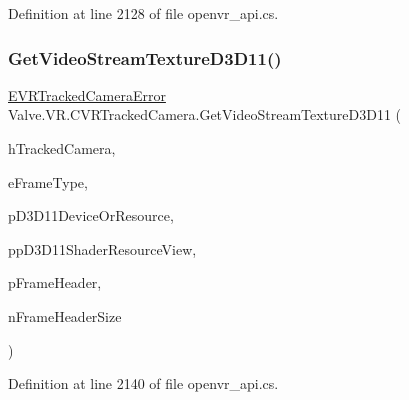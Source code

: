 Definition at line 2128 of file openvr\+\_\+api.\+cs.

\mbox{\label{class_valve_1_1_v_r_1_1_c_v_r_tracked_camera_a75788ecc02f0d8f2164f01678ff4186a}} 
\subsubsection{\texorpdfstring{GetVideoStreamTextureD3D11()}{GetVideoStreamTextureD3D11()}}
{\footnotesize\ttfamily \mbox{\hyperlink{namespace_valve_1_1_v_r_ad0e012e846f5d93848783c044614cfd3}{E\+V\+R\+Tracked\+Camera\+Error}} Valve.\+V\+R.\+C\+V\+R\+Tracked\+Camera.\+Get\+Video\+Stream\+Texture\+D3\+D11 (\begin{DoxyParamCaption}\item[{ulong}]{h\+Tracked\+Camera,  }\item[{\mbox{\hyperlink{namespace_valve_1_1_v_r_a9962211bc3fe98c2683db188c12c9afd}{E\+V\+R\+Tracked\+Camera\+Frame\+Type}}}]{e\+Frame\+Type,  }\item[{Int\+Ptr}]{p\+D3\+D11\+Device\+Or\+Resource,  }\item[{ref Int\+Ptr}]{pp\+D3\+D11\+Shader\+Resource\+View,  }\item[{ref \mbox{\hyperlink{struct_valve_1_1_v_r_1_1_camera_video_stream_frame_header__t}{Camera\+Video\+Stream\+Frame\+Header\+\_\+t}}}]{p\+Frame\+Header,  }\item[{uint}]{n\+Frame\+Header\+Size }\end{DoxyParamCaption})}



Definition at line 2140 of file openvr\+\_\+api.\+cs.

\mbox{\label{class_valve_1_1_v_r_1_1_c_v_r_tracked_camera_a9e2a9c4bee0a46c9125d0b9c6babf639}} 
